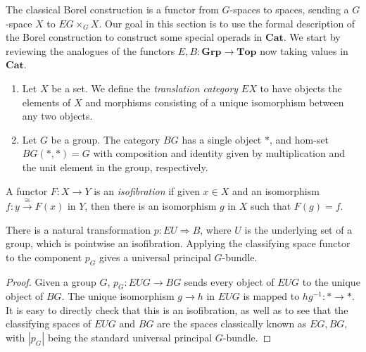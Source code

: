 \documentclass{amsbook} %
\newcommand{\mb}{\mathbf}
\numberwithin{section}{chapter}
\begin{document}
The classical Borel construction is a functor from $G$-spaces to spaces, sending a $G$-space $X$ to $EG \times_{G} X$.  Our goal in this section is to use the formal description of the Borel construction to construct some special operads in $\mb{Cat}$.   We start by reviewing the analogues of the functors $E, B \colon \mb{Grp} \rightarrow \mb{Top}$ now taking values in $\mb{Cat}$.

\begin{Defi}\label{Defi:e_b}
  \begin{enumerate}
    \item Let $X$ be a set.  We define the \textit{translation category} $EX$ to have objects the elements of $X$ and morphisms consisting of a unique isomorphism between any two objects.
    \item Let $G$ be a group.  The category $BG$ has a single object $*$, and hom-set $BG(*,*) = G$ with composition and identity given by multiplication and the unit element in the group, respectively.
  \end{enumerate}
\end{Defi}

\begin{Defi}
A functor $F \colon X \rightarrow Y$ is an \emph{isofibration} if given $x \in X$ and an isomorphism $f\colon y \xrightarrow{\cong} F(x)$ in $Y$, then there is an isomorphism $g$ in $X$ such that $F(g) = f$.
\end{Defi}

\begin{prop}
There is a natural transformation $p \colon EU \Rightarrow B$, where $U$ is the underlying set of a group, which is pointwise an isofibration.  Applying the classifying space functor to the component $p_{G}$ gives a universal principal $G$-bundle.
\end{prop}
\begin{proof}
Given a group $G$, $p_{G} \colon EUG \rightarrow BG$ sends every object of $EUG$ to the unique object of $BG$.  The unique isomorphism $g \rightarrow  h$ in $EUG$ is mapped to $hg^{-1} \colon * \rightarrow *$.  It is easy to directly check that this is an isofibration, as well as to see that the classifying spaces of $EUG$ and $BG$ are the spaces classically known as $EG,BG$, with $|p_{G}|$ being the standard universal principal $G$-bundle.
\end{proof}
\end{document}
